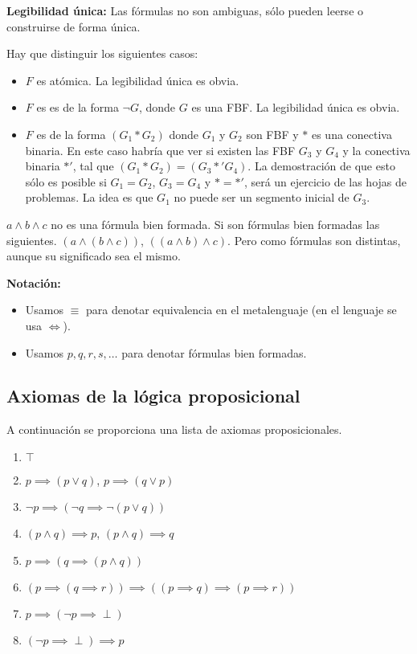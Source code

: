 \begin{lemma}{\textbf{Legibilidad única:}}
	Las fórmulas no son ambiguas, sólo pueden leerse o construirse de forma única.
\end{lemma}
Hay que distinguir los siguientes casos:
\begin{itemize}
	\item $F$ es atómica. La legibilidad única es obvia.
	\item $F$ es es de la forma $\neg G$, donde $G$ es una FBF. La legibilidad única es obvia.
	\item $F$ es de la forma $(G_1\ast G_2)$ donde $G_1$ y $G_2$ son FBF y $\ast$ es una conectiva binaria. En este caso habría que ver si existen las FBF $G_3$ y $G_4$ y la conectiva binaria $\ast'$, tal que $(G_1\ast G_2) = (G_3\ast ' G_4)$. La demostración de que esto sólo es posible si $G_1=G_2$, $G_3=G_4$ y $\ast = \ast'$, será un ejercicio de las hojas de problemas. La idea es que $G_1$ no puede ser un segmento inicial de $G_3$.
\end{itemize}

\begin{obs}
	$a\wedge b \wedge c$ no es una fórmula bien formada. Si son fórmulas bien formadas las siguientes. $(a\wedge (b\wedge c))$, $((a\wedge b) \wedge c)$. Pero como fórmulas son distintas, aunque su significado sea el mismo.
\end{obs}

\begin{mdframed}
	\textbf{Notación:}
	\begin{itemize}
	\vspace{-3mm}
	\item Usamos $\equiv$ para denotar equivalencia en el metalenguaje (en el lenguaje se usa $\iff$).

	\item Usamos $p,q,r,s,\hdots$ para denotar fórmulas bien formadas.
	\end{itemize}
\end{mdframed}




\subsection{Axiomas de la lógica proposicional}
A continuación se proporciona una lista de axiomas proposicionales.
\begin{enumerate}
	\item $\top$
	\item $p\implies (p\vee q)$, $p\implies (q\vee p)$
	\item $\neg p \implies (\neg q \implies \neg (p\vee q))$
	\item $(p\wedge q)\implies p$, $(p\wedge q)\implies q$
	\item $p\implies (q\implies (p\wedge q))$
	\item $(p\implies(q\implies r))\implies ((p\implies q)\implies(p\implies r))$
	\item $p\implies(\neg p\implies \perp)$
	\item $(\neg p\implies \perp)\implies p$
\end{enumerate}

